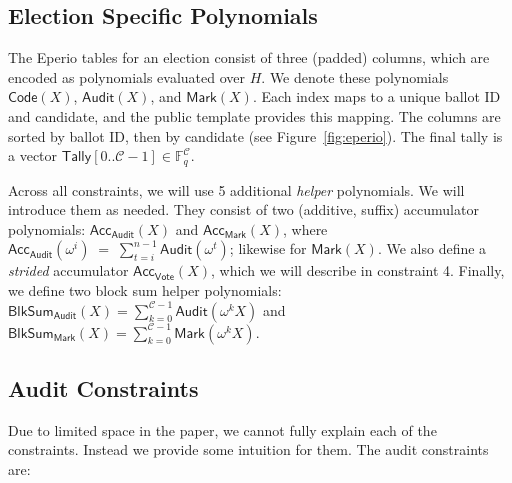 \subsection{Election Specific Polynomials}

The Eperio tables for an election consist of three (padded) columns, which are encoded as polynomials evaluated over $H$. We denote these polynomials $\mathsf{Code}(X)$, $\mathsf{Audit}(X)$, and $\mathsf{Mark}(X)$. Each index maps to a unique ballot ID and candidate, and the public template provides this mapping. The columns are sorted by ballot ID, then by candidate (see Figure~\ref{fig:eperio}). The final tally is a vector $\mathsf{Tally}[0..\mathcal{C}-1]\in\mathbb{F}_q^{\mathcal{C}}$.

Across all constraints, we will use 5 additional \emph{helper} polynomials. We will introduce them as needed. They consist of two (additive, suffix) accumulator polynomials: $\mathsf{Acc}_{\mathsf{Audit}}(X)$ and $\mathsf{Acc}_{\mathsf{Mark}}(X)$, where $\mathsf{Acc}_{\mathsf{Audit}}(\omega^{i}) \;=\; \sum_{t=i}^{n-1} \mathsf{Audit}(\omega^{t})$; likewise for $\mathsf{Mark}(X)$. We also define a \emph{strided} accumulator $\mathsf{Acc}_{\mathsf{Vote}}(X)$, which we will describe in constraint 4. Finally, we define two block sum helper polynomials: $\mathsf{BlkSum}_{\mathsf{Audit}}(X)=\sum_{k=0}^{\mathcal{C}-1}\mathsf{Audit}(\omega^k X)$ and $\mathsf{BlkSum}_{\mathsf{Mark}}(X)=\sum_{k=0}^{\mathcal{C}-1}\mathsf{Mark}(\omega^k X)$.

%

\subsection{Audit Constraints}
\label{sec:audit}

Due to limited space in the paper, we cannot fully explain each of the \constraints constraints. Instead we provide some intuition for them. The audit constraints are:

